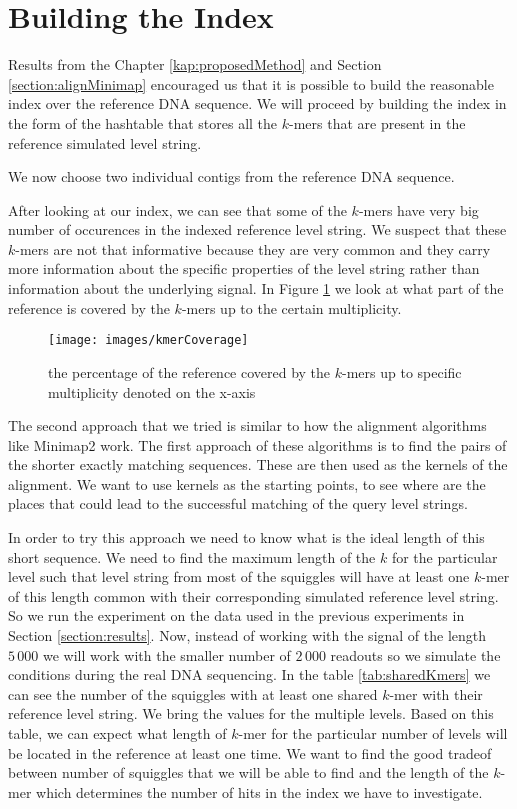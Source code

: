 \section{Building the Index}

Results from the Chapter \ref{kap:proposedMethod} and Section \ref{section:alignMinimap}
encouraged us that it is possible to build the reasonable index over the reference
DNA sequence. We will proceed by building the index in the form of the hashtable
that stores all the $k$-mers that are present in the reference simulated level string.

We now choose two individual contigs from the reference DNA sequence.

After looking at our index, we can see that some of the $k$-mers have very big
number of occurences in the indexed reference level string. We suspect that these
$k$-mers are not that informative because they are very common and they carry more
information about the specific properties of the level string rather than information
about the underlying signal. In Figure \ref{obr:kmerCoverage} we look at what part of the
reference is covered by the $k$-mers up to the certain multiplicity.

\begin{figure}
\centerline{\texttt{[image: images/kmerCoverage]}}
\caption[TODO]{the percentage of the reference covered by the $k$-mers up to specific multiplicity
denoted on the x-axis}
\label{obr:kmerCoverage}
\end{figure}


The second approach that we tried is similar to how the alignment algorithms like
Minimap2 work. The first approach of these algorithms is to find the pairs of the shorter
exactly matching sequences. These are then used as the kernels of the alignment. We want
to use kernels as the starting points, to see where are the places that could lead to the
successful matching of the query level strings.

In order to try this approach we need to know what is the ideal length of this short
sequence. We need to find the maximum length of the $k$ for the particular level
such that level string from most of the squiggles will have at least one $k$-mer
of this length common with their corresponding simulated reference level string.
So we run the experiment on the data used in the previous experiments in Section
\ref{section:results}. Now, instead of working with the signal of the length
$5\,000$ we will work with the smaller number of $2\,000$ readouts so we
simulate the conditions during the real DNA sequencing. In the table \ref{tab:sharedKmers}
we can see the number of the squiggles with at least one shared $k$-mer with their reference
level string. We bring the values for the multiple levels. Based on this table,
we can expect what length of $k$-mer for the particular number of levels will be located
in the reference at least one time. We want to find the good tradeof between number of
squiggles that we will be able to find and the length of the $k$-mer which determines
the number of hits in the index we have to investigate.

